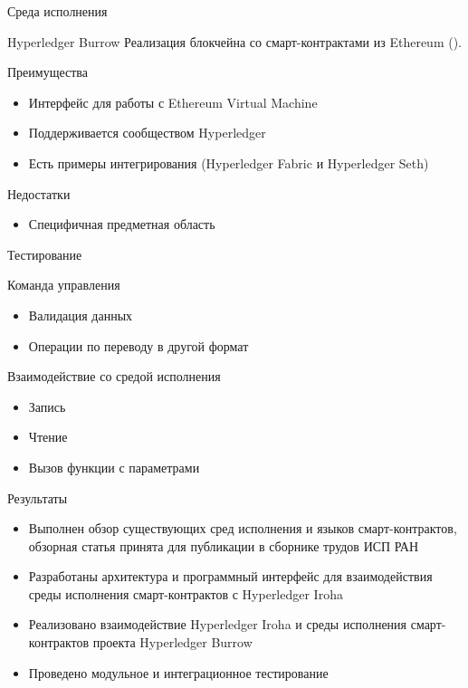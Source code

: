 \documentclass[hyperref={pdfpagelabels=false}]{beamer}
\begin{document}
\begin{frame}{Среда исполнения}
\begin{block}{Hyperledger Burrow}
Реализация блокчейна со смарт-контрактами из Ethereum ({\color{blue}{https://github.com/hyperledger/burrow}}).
\end{block}
\vfill
\begin{block}{Преимущества}
\begin{itemize}
\item Интерфейс для работы с Ethereum Virtual Machine
\vfill
\item Поддерживается сообществом Hyperledger
\vfill
\item Есть примеры интегрирования (Hyperledger Fabric и Hyperledger Seth)
\end{itemize}
\end{block}
\vfill
\begin{block}{Недостатки}
\begin{itemize}
\item Специфичная предметная область 
\end{itemize}
\end{block}

\end{frame} 

\begin{frame}{Тестирование}
\begin{block}{Команда управления}
\begin{itemize}
\item Валидация данных
\vfill
\item Операции по переводу в другой формат
\end{itemize}
\end{block}
\vfill
\begin{block}{Взаимодействие со средой исполнения}
\begin{itemize}
\item Запись
\vfill
\item Чтение
\vfill
\item Вызов функции с параметрами
\end{itemize}
\end{block}
\end{frame} 

\begin{frame}{Результаты}
\begin{itemize}
\item Выполнен обзор существующих сред исполнения и языков смарт-контрактов, обзорная статья принята для публикации в сборнике трудов ИСП РАН
\vfill
\item Разработаны архитектура и программный интерфейс для взаимодействия среды исполнения смарт-контрактов с Hyperledger Iroha
\vfill
\item Реализовано взаимодействие Hyperledger Iroha и среды исполнения смарт-контрактов проекта Hyperledger Burrow
\vfill
\item Проведено модульное и интеграционное тестирование
\end{itemize}
\end{frame} 
\end{document}

